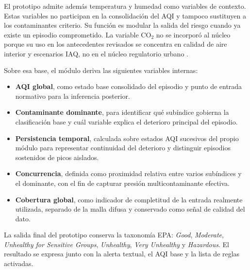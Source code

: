 El prototipo admite además temperatura y humedad como variables de contexto. Estas variables no participan en la consolidación del AQI y tampoco sustituyen a los contaminantes criterio. Su función es modular la salida del riesgo cuando ya existe un episodio comprometido. La variable CO$_2$ no se incorporó al núcleo porque su uso en los antecedentes revisados se concentra en calidad de aire interior y escenarios IAQ, no en el núcleo regulatorio urbano \cite{A135,A165,A167}.

Sobre esa base, el módulo deriva las siguientes variables internas:
\begin{itemize}
\item \textbf{AQI global}, como estado base consolidado del episodio y punto de entrada normativo para la inferencia posterior.
\item \textbf{Contaminante dominante}, para identificar qué subíndice gobierna la clasificación base y cuál variable explica el deterioro principal del episodio.
\item \textbf{Persistencia temporal}, calculada sobre estados AQI sucesivos del propio módulo para representar continuidad del deterioro y distinguir episodios sostenidos de picos aislados.
\item \textbf{Concurrencia}, definida como proximidad relativa entre varios subíndices y el dominante, con el fin de capturar presión multicontaminante efectiva.
\item \textbf{Cobertura global}, como indicador de completitud de la entrada realmente utilizada, separado de la malla difusa y conservado como señal de calidad del dato.
\end{itemize}

La salida final del prototipo conserva la taxonomía EPA: \textit{Good}, \textit{Moderate}, \textit{Unhealthy for Sensitive Groups}, \textit{Unhealthy}, \textit{Very Unhealthy} y \textit{Hazardous}. El resultado se expresa junto con la alerta textual, el AQI base y la lista de reglas activadas.

